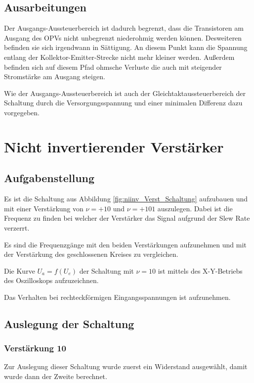 \subsection{Ausarbeitungen}
Der Ausgangs-Aussteuerbereich ist dadurch begrenzt, dass die Transistoren am Ausgang des OPVs nicht unbegrenzt niederohmig werden können. Desweiteren befinden sie sich irgendwann in Sättigung. An diesem Punkt kann die Spannung entlang der Kollektor-Emitter-Strecke nicht mehr kleiner werden. Außerdem befinden sich auf diesem Pfad ohmsche Verluste die auch mit steigender Stromstärke am Ausgang steigen.

Wie der Ausgangs-Aussteuerbereich ist auch der Gleichtaktaussteuerbereich der Schaltung durch die Versorgungsspannung und einer minimalen Differenz dazu vorgegeben.
\section{Nicht invertierender Verstärker}
\subsection{Aufgabenstellung}
Es ist die Schaltung aus Abbildung \ref{fig:niinv_Verst_Schaltung} aufzubauen und mit  einer Verstärkung von $\nu=+10$ und $\nu = +101$ auszulegen. Dabei ist die Frequenz zu finden bei welcher der Verstärker das Signal aufgrund der Slew Rate verzerrt. 

Es sind die Frequenzgänge mit den beiden Verstärkungen aufzunehmen und mit der Verstärkung des geschlossenen Kreises zu vergleichen.

Die Kurve $U_a = f(U_e)$ der Schaltung mit $\nu=10$ ist mittels des X-Y-Betriebs des Oszilloskops aufzuzeichnen.

Das Verhalten bei rechteckförmigen Eingangsspannungen ist aufzunehmen.


\subsection{Auslegung der Schaltung}
\subsubsection{Verstärkung 10}
Zur Auslegung dieser Schaltung wurde zuerst ein Widerstand ausgewählt, damit wurde dann der Zweite berechnet.


